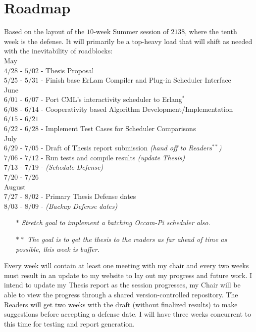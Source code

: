 \section{Roadmap}

Based on the layout of the $10$-week Summer session of $2138$, where the tenth week
is the defense. It will primarily be a top-heavy load that will shift as needed
with the inevitability of roadblocks:\\

    May\\
    	$4/28$ - $5/02$ - Thesis Proposal\\
        $5/25$ - $5/31$ - Finish base ErLam Compiler and Plug-in Scheduler Interface \\

    June \\
        $6/01$ - $6/07$ - Port CML's interactivity scheduler to Erlang$^*$\\
        $6/08$ - $6/14$ - Cooperativity based Algorithm Development/Implementation \\
        $6/15$ - $6/21$ \\
        $6/22$ - $6/28$ - Implement Test Cases for Scheduler Comparisons\\

    July\\
        $6/29$ - $7/05$ - Draft of Thesis report submission {\em (hand off to Readers$^{**}$)} \\
        $7/06$ - $7/12$ - Run tests and compile results {\em (update Thesis)} \\
        $7/13$ - $7/19$ - {\em(Schedule Defense)}\\
        $7/20$ - $7/26$ \\

    August\\
        $7/27$ - $8/02$ - Primary Thesis Defense dates\\
        $8/03$ - $8/09$ - {\em(Backup Defense dates)}

\begin{itemize}
\setlength{\itemsep}{1pt}
\setlength{\parskip}{0pt}
\setlength{\parsep}{0pt}
\item[$*$]{\small\em Stretch goal to implement a batching Occam-Pi scheduler also.}
\item[$**$]{\small\em The goal is to get the thesis to the readers as far ahead of time as possible, this week is buffer.}
\end{itemize}

Every week will contain at least one meeting with my chair and every two weeks
must result in an update to my website to lay out my progress and future work. 
I intend to update my Thesis report as the session progresses, my Chair will be 
able to view the progress through a shared version-controlled repository. The
Readers will get two weeks with the draft (without finalized results) to make
suggestions before accepting a defense date. I will have three weeks concurrent
to this time for testing and report generation.\\

